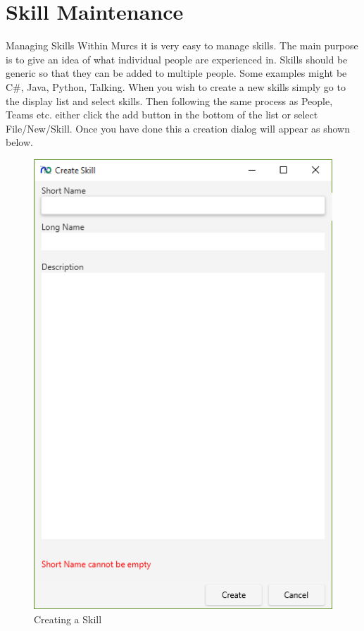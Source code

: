 \section{Skill Maintenance}

Managing Skills
\newline\newline
Within Murcs it is very easy to manage skills. The main purpose is to give an idea of what individual people are experienced in. Skills should be generic so that they can be added to multiple people. Some examples might be C\#, Java, Python, Talking.
\newline
When you wish to create a new skills simply go to the display list and select skills. Then following the same process as People, Teams etc. either click the add button in the bottom of the list or select File/New/Skill. Once you have done this a creation dialog will appear as shown below.

\begin{figure}[H]
\centering
\includegraphics[width=\textwidth]{images/screenshots/skills1.PNG}
\caption{Creating a Skill}
\label{fig:new_project}
\end{figure}

